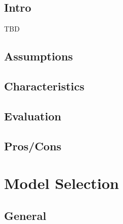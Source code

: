 \documentclass[]{book}
\theoremstyle{definition}
\theoremstyle{definition}
\theoremstyle{definition}
\theoremstyle{remark}
\begin{document}
\subsection{Intro}\label{intro-17}

TBD

\subsection{Assumptions}\label{assumptions-17}

\subsection{Characteristics}\label{characteristics-12}

\subsection{Evaluation}\label{evaluation-16}

\subsection{Pros/Cons}\label{proscons-17}

\section{Model Selection}\label{model-selection}

\subsection{General}\label{general-4}
\end{document}
